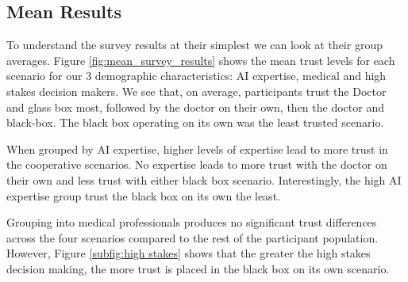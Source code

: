 \documentclass[manuscript,screen,review]{acmart}
\begin{document}

\subsection{Mean Results}

To understand the survey results at their simplest we can look at their group averages. Figure \ref{fig:mean_survey_results} shows the mean trust levels for each scenario for our 3 demographic characteristics: AI expertise, medical and high stakes decision makers. We see that, on average, participants trust the Doctor and glass box most, followed by the doctor on their own, then the doctor and black-box. The black box operating on its own was the least trusted scenario. 

When grouped by AI expertise, higher levels of expertise lead to more trust in the cooperative scenarios. No expertise leads to more trust with the doctor on their own and less trust with either black box scenario. Interestingly, the high AI expertise group trust the black box on its own the least.

Grouping into medical professionals produces no significant trust differences across the four scenarios compared to the rest of the participant population. However, Figure \ref{subfig:high stakes} shows that the greater the high stakes decision making, the more trust is placed in the black box on its own scenario.
\end{document}
